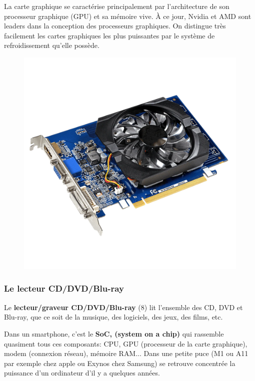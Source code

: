 \documentclass[11pt, a4paper]{book}
\begin{document}
La { carte graphique} se caractérise principalement par l'architecture de son processeur graphique (GPU) et sa mémoire vive. À ce jour, Nvidia et AMD sont leaders dans la conception des processeurs graphiques. On distingue très facilement les cartes graphiques les plus puissantes par le système de refroidissement qu’elle possède.
	
	\begin{figure}[ht!]
	\centering
	\includegraphics[scale=.2]{images/carte_graphique}

\end{figure}

\vspace{10pt}
\subsubsection{  Le lecteur CD/DVD/Blu-ray } 
Le {\bf lecteur/graveur CD/DVD/Blu-ray } (8) lit l'ensemble des CD, DVD et Blu-ray, que ce soit de la musique, des logiciels, des jeux, des films, etc.


\begin{remarque}
Dans un smartphone, c'est le {\bf SoC, (system on a chip)} qui rassemble quasiment tous ces composants: CPU, GPU (processeur de la carte graphique), modem (connexion réseau), mémoire RAM... Dans une petite puce (M1 ou A11 par exemple chez apple ou Exynos chez Samsung) se retrouve concentrée la puissance d'un ordinateur d'il y a quelques années.
\end{remarque}
\end{document}
